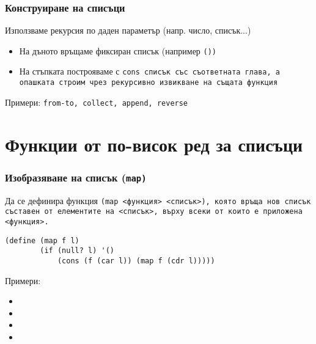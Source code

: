 \documentclass{beamer}
\begin{document}
\begin{frame}
  \frametitle{Конструиране на списъци}

  Използваме рекурсия по даден параметър (напр. число, списък...)
  \begin{itemize}
  \item На дъното връщаме фиксиран списък (например \tt{()})
  \item На стъпката построяваме с \tt{cons} списък със съответната глава, а опашката строим чрез рекурсивно извикване на същата функция
  \end{itemize}

  \pause
  \vspace{2em}
  Примери: \tt{from-to}, \tt{collect}, \tt{append}, \tt{reverse}
\end{frame}

\section{Функции от по-висок ред за списъци}

\begin{frame}[fragile]
  \frametitle{Изобразяване на списък (\tt{map})}

  Да се дефинира функция \tt{(map <функция> <списък>)}, която връща нов списък съставен от елементите на <списък>, върху всеки от които е приложена <функция>.

  \pause

\begin{verbatim}
(define (map f l)
        (if (null? l) '()
            (cons (f (car l)) (map f (cdr l)))))
\end{verbatim}

  \pause

  Примери:
  \small
  \begin{itemize}[<+->]
  \item {}
  \item {}
  \item {}
  \item {}
  \end{itemize}
\end{frame}
\end{document}
